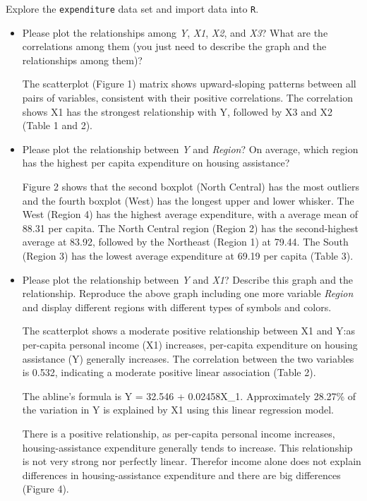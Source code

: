 \documentclass[12pt,letterpaper]{article}
\begin{document}
\vspace{.5cm}
\noindent Explore the \texttt{expenditure} data set and import data into \texttt{R}.
\vspace{.5cm}
  
\vspace{.5cm}
\begin{itemize}

\item
Please plot the relationships among \emph{Y}, \emph{X1}, \emph{X2}, and \emph{X3}? What are the correlations among them (you just need to describe the graph and the relationships among them)?
	
\text The scatterplot (Figure 1) matrix shows upward-sloping patterns between all pairs of variables, consistent with their positive correlations. The correlation shows X1 has the strongest relationship with Y, followed by X3 and X2 (Table 1 and 2).
	
\vspace{.5cm}
\item
Please plot the relationship between \emph{Y} and \emph{Region}? On average, which region has the highest per capita expenditure on housing assistance?
	
Figure 2 shows that the second boxplot (North Central) has the most outliers and the fourth boxplot (West) has the longest upper and lower whisker. The West (Region 4) has the highest average expenditure, with a average mean of 88.31 per capita. The North Central region (Region 2) has the second-highest average at 83.92, followed by the Northeast (Region 1) at 79.44. The South (Region 3) has the lowest average expenditure at 69.19 per capita (Table 3).
	
\vspace{.5cm}
\item
Please plot the relationship between \emph{Y} and \emph{X1}? Describe this graph and the relationship. Reproduce the above graph including one more variable \emph{Region} and display different regions with different types of symbols and colors.
	
The scatterplot shows a moderate positive relationship between X1 and Y:as per-capita personal income (X1) increases, per-capita expenditure on housing assistance (Y) generally increases. The correlation between the two variables is 0.532, indicating a moderate positive linear association (Table 2). 

The abline's formula is Y = 32.546 + 0.02458X\_1. Approximately 28.27\% of the variation in Y is explained by X1 using this linear regression model.

There is a positive relationship, as per-capita personal income increases, housing-assistance expenditure generally tends to increase. This relationship is not very strong nor perfectly linear. Therefor income alone does not explain differences in housing-assistance expenditure and there are big differences (Figure 4).
	
\end{itemize}
\end{document}
